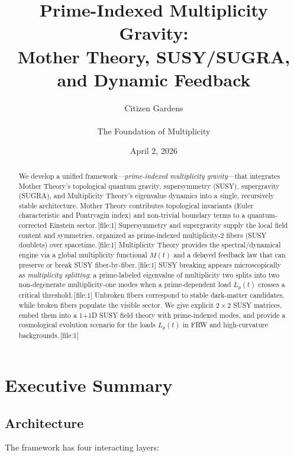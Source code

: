 \documentclass[11pt]{article}
\title{Prime-Indexed Multiplicity Gravity:\\
Mother Theory, SUSY/SUGRA, and Dynamic Feedback}
\author{Citizen Gardens \\ \\ The Foundation of Multiplicity}
\date{April 2, 2026}
\begin{document}
\maketitle

\begin{abstract}
We develop a unified framework---\emph{prime-indexed multiplicity gravity}---that integrates Mother Theory's topological quantum gravity, supersymmetry (SUSY), supergravity (SUGRA), and Multiplicity Theory's eigenvalue dynamics into a single, recursively stable architecture. Mother Theory contributes topological invariants (Euler characteristic and Pontryagin index) and non-trivial boundary terms to a quantum-corrected Einstein sector.\,[file:1] Supersymmetry and supergravity supply the local field content and symmetries, organized as prime-indexed multiplicity-2 fibers (SUSY doublets) over spacetime.\,[file:1] Multiplicity Theory provides the spectral/dynamical engine via a global multiplicity functional \(M(t)\) and a delayed feedback law that can preserve or break SUSY fiber-by-fiber.\,[file:1] SUSY breaking appears microscopically as \emph{multiplicity splitting}: a prime-labeled eigenvalue of multiplicity two splits into two non-degenerate multiplicity-one modes when a prime-dependent load \(L_p(t)\) crosses a critical threshold.\,[file:1] Unbroken fibers correspond to stable dark-matter candidates, while broken fibers populate the visible sector. We give explicit \(2\times 2\) SUSY matrices, embed them into a 1+1D SUSY field theory with prime-indexed modes, and provide a cosmological evolution scenario for the loads \(L_p(t)\) in FRW and high-curvature backgrounds.\,[file:1]
\end{abstract}

\section{Executive Summary}

\subsection{Architecture}

The framework has four interacting layers:
\end{document}
